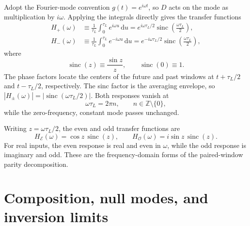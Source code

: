 \documentclass[12pt]{article}
\begin{document}
Adopt the Fourier-mode convention $g(t)=e^{i\omega t}$, so $D$ acts on the mode as multiplication by $i\omega$. Applying the integrals directly gives the transfer functions
\begin{align}
  H_{+}(\omega)
  &\equiv\frac{1}{\tau_L}\int_0^{\tau_L}e^{i\omega u}\,\mathrm{d}u
   =e^{i\omega\tau_L/2}
    \operatorname{sinc}\!\left(\frac{\omega\tau_L}{2}\right),
  \label{eq:transfer-plus}\\
  H_{-}(\omega)
  &\equiv\frac{1}{\tau_L}\int_0^{\tau_L}e^{-i\omega u}\,\mathrm{d}u
   =e^{-i\omega\tau_L/2}
    \operatorname{sinc}\!\left(\frac{\omega\tau_L}{2}\right),
  \label{eq:transfer-minus}
\end{align}
where
\begin{equation}
  \operatorname{sinc}(z)\equiv\frac{\sin z}{z},
  \qquad \operatorname{sinc}(0)\equiv1.
  \label{eq:sinc-definition}
\end{equation}
The phase factors locate the centers of the future and past windows at $t+\tau_L/2$ and $t-\tau_L/2$, respectively. The sinc factor is the averaging envelope, so $|H_{\pm}(\omega)|=|\operatorname{sinc}(\omega\tau_L/2)|$. Both responses vanish at
\begin{equation}
  \omega\tau_L=2\pi n,
  \qquad n\in\mathbb{Z}\setminus\{0\},
  \label{eq:sinc-zeros}
\end{equation}
while the zero-frequency, constant mode passes unchanged.

Writing $z=\omega\tau_L/2$, the even and odd transfer functions are
\begin{equation}
  H_{\mathcal E}(\omega)=\cos z\,\operatorname{sinc}(z),
  \qquad
  H_{\mathcal O}(\omega)=i\sin z\,\operatorname{sinc}(z).
  \label{eq:even-odd-transfer}
\end{equation}
For real inputs, the even response is real and even in $\omega$, while the odd response is imaginary and odd. These are the frequency-domain forms of the paired-window parity decomposition.

\section{Composition, null modes, and inversion limits}
\end{document}
